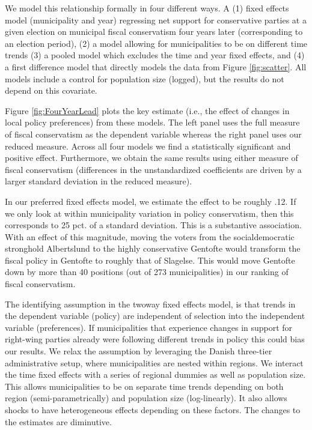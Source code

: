 \documentclass[a4paper,12pt]{article}
\begin{document}
We model this relationship formally in four different ways. A (1) fixed effects model (municipality and year) regressing net support for conservative parties at a given election on municipal fiscal conservatism four years later (corresponding to an election period), (2) a model allowing for municipalities to be on different time trends (3) a pooled model which excludes the time and year fixed effects, and (4) a first difference model that directly models the data from Figure \ref{fig:scatter}. All models include a control for population size (logged), but the results do not depend on this covariate.

Figure \ref{fig:FourYearLead} plots the key estimate (i.e., the effect of changes in local policy preferences) from these models. The  left panel uses the full measure of fiscal conservatism as the dependent variable whereas the right panel uses our reduced measure. Across all four models we find a statistically significant and positive effect. Furthermore, we obtain the same results using either measure of fiscal conservatism (differences in the unstandardized coefficients are driven by a larger standard deviation in the reduced measure).


In our preferred fixed effects model, we estimate the effect to be roughly .12. If we only look at within municipality variation in policy conservatism, then this corresponds to 25 pct. of a standard deviation.  This is a substantive association. With an effect of this magnitude, moving the voters from the socialdemocratic stronghold Albertslund to the highly conservative Gentofte would transform the fiscal policy in Gentofte to roughly that of Slagelse. This would move Gentofte down by more than 40 positions (out of 273 municipalities) in our ranking of fiscal conservatism.

The identifying assumption in the twoway fixed effects model, is that trends in the dependent variable (policy) are independent of selection into the independent variable (preferences). If municipalities that experience changes in support for right-wing parties already were following different trends in policy this could bias our results. We relax the assumption by leveraging the Danish three-tier administrative setup, where municipalities are nested within regions. We interact the time fixed effects with a series of regional dummies as well as population size. This allows municipalities to be on separate time trends depending on both region (semi-parametrically) and population size (log-linearly). It also allows shocks to have heterogeneous effects depending on these factors. The changes to the estimates are diminutive.
\end{document}
